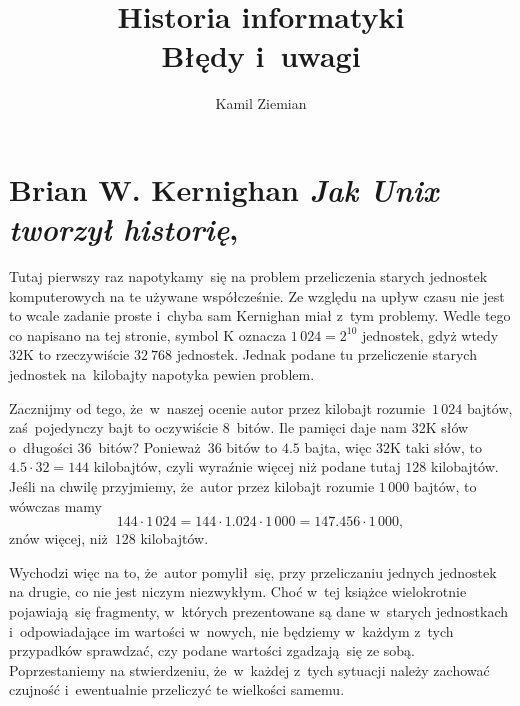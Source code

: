 \documentclass[a4paper,11pt]{article}
\title{Historia informatyki \\
  {\Large Błędy i~uwagi}}
\author{Kamil Ziemian \\
  \email}
\numberwithin{equation}{section}
\begin{document}





\maketitle





\section{Brian W. Kernighan \textit{Jak Unix tworzył historię},
  \parencite{Kernighan-Jak-Unix-tworzyl-historie-Pub-2021}}

\label{sec:Kernighan-Jak-Unix-tworzył-historię}



\noindent
{} Tutaj pierwszy raz napotykamy~się na problem przeliczenia starych
jednostek komputerowych na te używane współcześnie. Ze względu na upływ
czasu nie jest to wcale zadanie proste i~chyba sam Kernighan miał z~tym
problemy. Wedle tego co napisano na tej stronie, symbol $\text{K}$ oznacza
$1 \, 024 = 2^{ 10 }$ jednostek, gdyż wtedy $32\text{K}$ to rzeczywiście
$32 \ 768$ jednostek. Jednak podane tu przeliczenie starych jednostek
na~kilobajty napotyka pewien problem.

Zacznijmy od tego, że~w~naszej ocenie autor przez kilobajt
rozumie~$1 \, 024$ bajtów, zaś~pojedynczy bajt to oczywiście $8$~bitów.
Ile pamięci daje nam $32\text{K}$ słów o~długości $36$~bitów? Ponieważ~$36$
bitów to $4.5$ bajta, więc $32\text{K}$ taki słów, to $4.5 \cdot 32 = 144$
kilobajtów, czyli wyraźnie więcej niż podane tutaj $128$ kilobajtów. Jeśli na
chwilę przyjmiemy, że~autor przez kilobajt rozumie $1 \, 000$ bajtów, to
wówczas mamy
\begin{equation}
  \label{eq:Kernighan-Jak-Unix-etc-01}
  144 \cdot 1 \, 024 = 144 \cdot 1.024 \cdot 1 \, 000 = 147.456 \cdot 1 \, 000,
\end{equation}
znów więcej, niż~$128$ kilobajtów.

Wychodzi więc na to, że~autor pomylił~się, przy przeliczaniu jednych
jednostek na drugie, co nie jest niczym niezwykłym. Choć w~tej książce
wielokrotnie pojawiają~się fragmenty, w~których prezentowane są dane
w~starych jednostkach i~odpowiadające im wartości w~nowych, nie będziemy
w~każdym z~tych przypadków sprawdzać, czy podane wartości zgadzają~się
ze sobą. Poprzestaniemy na stwierdzeniu, że~w~każdej z~tych sytuacji należy
zachować czujność i~ewentualnie przeliczyć te wielkości samemu.
\end{document}
